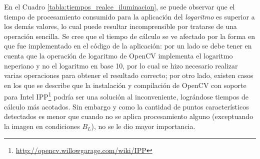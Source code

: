 
En el Cuadro \ref{tabla:tiempos_realce_iluminacion}, se puede observar que el tiempo de procesamiento consumido para la aplicación del \textit{logaritmo} es superior a los demás valores, lo cual puede resultar incomprensible por tratarse de una operación sencilla. Se cree que el tiempo de cálculo se ve afectado por la forma en que fue implementado en el código de la aplicación: por un lado se debe tener en cuenta que la operación de logaritmo de OpenCV implementa el logaritmo neperiano y no el logaritmo en base 10, por lo cual se hizo necesario realizar varias operaciones para obtener el resultado correcto; por otro lado, existen casos en los que se describe que la instalación y compilación de OpenCV con soporte para Intel IPP\footnote{\url{http://opencv.willowgarage.com/wiki/IPP}} podría ser una solución al inconveniente, lográndose tiempos de cálculo más acotados. Sin embargo y como la cantidad de puntos característicos detectados es menor que cuando no se aplica procesamiento alguno (exceptuando la imagen en condiciones $B_{L}$), no se le dio mayor importancia.
% 

